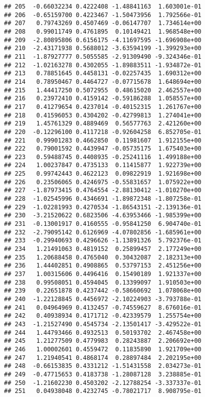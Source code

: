 \documentclass[
]{article}
\begin{document}
\begin{verbatim}
## 205  -0.66032234 0.4222408 -1.48841163  1.603001e-01
## 206  -0.65159700 0.4223467 -1.50473956  1.792566e-01
## 207   0.79743269 0.4507469 -0.06147707  1.734614e+00
## 208   0.99011749 0.4761895  0.10149421  1.968548e+00
## 209  -2.80895806 0.6156175 -4.11697595 -1.696908e+00
## 210  -2.43171938 0.5688012 -3.63594199 -1.399293e+00
## 211  -1.87927777 0.5055585 -2.91309490 -9.324346e-01
## 212  -1.02163278 0.4302055 -1.89883511 -1.934872e-01
## 213   0.78851645 0.4458131 -0.02257435  1.690312e+00
## 214   0.78950467 0.4464727 -0.07715678  1.648694e+00
## 215   1.44417250 0.5072955  0.48615020  2.462557e+00
## 216   0.23972410 0.4159142 -0.59186288  1.058557e+00
## 217   0.41279654 0.4237014 -0.40152315  1.261767e+00
## 218   0.41596053 0.4304202 -0.42799813  1.274041e+00
## 219   1.45761329 0.4889469  0.56577763  2.421260e+00
## 220  -0.12296100 0.4117218 -0.92604258  6.852705e-01
## 221   0.99901283 0.4662850  0.11981607  1.912155e+00
## 222   0.79001592 0.4439947 -0.05735175  1.675403e+00
## 223   0.59488745 0.4408935 -0.25241116  1.499188e+00
## 224   1.00237847 0.4735133  0.11415877  1.922739e+00
## 225   0.99742443 0.4622123  0.09822919  1.921698e+00
## 226   0.23506065 0.4246975 -0.55831657  1.075922e+00
## 227  -1.87973415 0.4764554 -2.88130412 -1.010270e+00
## 228  -1.02545996 0.4346691 -1.89872348 -1.807258e-01
## 229  -1.02281993 0.4270534 -1.86543151 -2.139136e-01
## 230  -3.21520622 0.6823506 -4.63953466 -1.985399e+00
## 231  -0.13001917 0.4160555 -0.95841250  6.904740e-01
## 232  -2.79095142 0.6126969 -4.07802856 -1.685961e+00
## 233  -0.29940693 0.4296626 -1.13891326  5.792376e-01
## 234   1.21491063 0.4819152  0.25899457  2.177249e+00
## 235   1.20688458 0.4765040  0.30432087  2.182313e+00
## 236   1.44402851 0.4908865  0.53797153  2.451256e+00
## 237   1.00315606 0.4496416  0.15490189  1.921337e+00
## 238   0.99508051 0.4594045  0.13399097  1.910503e+00
## 239   0.22651878 0.4237442 -0.58660692  1.078068e+00
## 240  -1.22128845 0.4456972 -2.10224903 -3.793788e-01
## 241   0.04964969 0.4132457 -0.74559627  8.676016e-01
## 242   0.40938934 0.4171712 -0.42339579  1.255754e+00
## 243  -1.21527490 0.4545734 -2.13501417 -3.429522e-01
## 244   1.44793466 0.4932513  0.50193702  2.467458e+00
## 245   1.21277509 0.4779983  0.28243887  2.206692e+00
## 246   1.00002601 0.4559472  0.11835890  1.921709e+00
## 247   1.21940541 0.4868174  0.28897484  2.202195e+00
## 248  -0.66153835 0.4331212 -1.51431558  2.034273e-01
## 249  -0.47715653 0.4183738 -1.28087128  3.238885e-01
## 250  -1.21602230 0.4503202 -2.12788254 -3.337337e-01
## 251   0.04938048 0.4232745 -0.78021717  8.908795e-01

\end{verbatim}
\end{document}
